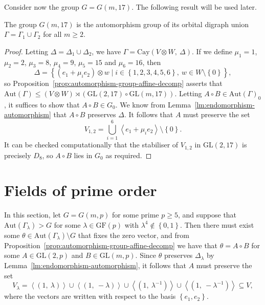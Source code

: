 \documentclass[ALCO, Unicode]{cedram}
\newcommand{\Aut}{\mathrm{Aut}}
\newcommand{\Cay}{\mathrm{Cay}}
\newcommand{\GF}{\mathrm{GF}}
\newcommand{\GL}{\mathrm{GL}}
\begin{document}
Consider now the group $G = G{\left(m, 17 \right)}$. The following result will be used later.

\begin{theorem} \label{thm:q=17}
The group $G{\left(m, 17 \right)}$ is the automorphism group of its orbital digraph union $\Gamma = \Gamma_1 \cup \Gamma_2$ for all $m \geqslant 2$.
\end{theorem}
\begin{proof}
Letting $\Delta = \Delta_1 \cup \Delta_2$, we have $\Gamma = \Cay{\left(V \otimes W,\ \Delta \right)}$. If we define $\mu_1 = 1$, $\mu_2 = 2$, $\mu_3 = 8$, $\mu_4 = 9$, $\mu_5 = 15$ and $\mu_6 = 16$, then
\begin{displaymath}
    \Delta = {\left\{\left(e_1 + \mu_i e_2 \right) \otimes w \mid i \in {\left\{1, 2, 3, 4, 5, 6 \right\}},\ w \in W \setminus \left\{0 \right\}\right\}},
\end{displaymath}
so Proposition~\ref{prop:automorphism-group-affine-decomp} asserts that $\Aut{\left(\Gamma \right)} \leqslant \left(V \otimes W \right) \rtimes \left(\GL{\left(2, 17 \right)} \circ \GL{\left(m, 17 \right)}\right)$. Letting $A \circ B \in \Aut{\left(\Gamma \right)}_0$, it suffices to show that $A \circ B \in G_0$. We know from Lemma~\ref{lm:endomorphism-automorphism} that $A \circ B$ preserves $\Delta$. It follows that $A$ must preserve the set
\begin{displaymath}
    V_{1,2} = \bigcup_{i=1}^6 \left<e_1 + \mu_i e_2 \right> \setminus {\left\{0 \right\}}.
\end{displaymath}
It can be checked computationally that the stabiliser of $V_{1,2}$ in $\GL{\left(2, 17 \right)}$ is precisely $D_8$, so $A \circ B$ lies in $G_0$ as required.
\end{proof}

\section{Fields of prime order}

In this section, let $G = G{\left(m, p \right)}$ for some prime $p \geqslant 5$, and suppose that $\Aut{\left(\Gamma_\lambda \right)} > G$ for some $\lambda \in \GF{\left(p \right)}$ with $\lambda^4 \notin \left\{0, 1 \right\}$. Then there must exist some $\theta \in \Aut{\left(\Gamma_\lambda \right)} \setminus G$ that fixes the zero vector, and from Proposition~\ref{prop:automorphism-group-affine-decomp} we have that $\theta = A \circ B$ for some $A \in \GL{\left(2, p \right)}$ and $B \in \GL{\left(m, p \right)}$. Since $\theta$ preserves $\Delta_\lambda$ by Lemma~\ref{lm:endomorphism-automorphism}, it follows that $A$ must preserve the set
\begin{displaymath}
V_\lambda = \left<\left(1,\ \lambda \right)\right> \cup \left<\left(1,\ -\lambda \right)\right> \cup \left<\left(1,\ \lambda^{-1} \right)\right> \cup \left<\left(1,\ -\lambda^{-1} \right)\right> \subseteq V,
\end{displaymath}
where the vectors are written with respect to the basis $\left\{e_1, e_2 \right\}$.
\end{document}
